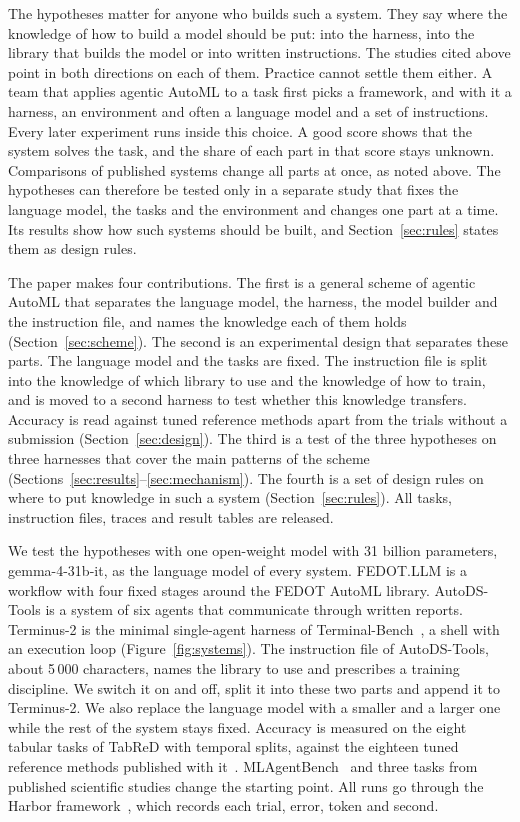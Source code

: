 The hypotheses matter for anyone who builds such a system. They say where
the knowledge of how to build a model should be put: into the harness, into
the library that builds the model or into written instructions. The studies cited above point in both directions
on each of them. Practice cannot settle them either. A team that applies
agentic AutoML to a task first picks a framework, and with it a harness, an
environment and often a language model and a set of instructions. Every
later experiment runs inside this choice. A good score shows that the system
solves the task, and the share of each part in that score stays unknown.
Comparisons of published systems change all parts at once, as noted above.
The hypotheses can therefore be tested only in a separate study that fixes
the language model, the tasks and the environment and changes one part at a
time. Its results show how such systems should be built, and
Section~\ref{sec:rules} states them as design rules.

The paper makes four contributions. The first is a general scheme of
agentic AutoML that separates the language model, the harness, the model
builder and the instruction file, and names the knowledge each of them holds
(Section~\ref{sec:scheme}). The second is an experimental design that
separates these parts. The language model and the tasks are fixed. The
instruction file is split into the knowledge of which library to use and
the knowledge of how to train, and is moved to a second harness to test
whether this knowledge transfers. Accuracy is read against tuned reference
methods apart from the trials without a submission
(Section~\ref{sec:design}). The third is a test of the three hypotheses on
three harnesses that cover the main patterns of the scheme
(Sections~\ref{sec:results}--\ref{sec:mechanism}). The fourth is a set of
design rules on where to put knowledge in such a system
(Section~\ref{sec:rules}). All tasks, instruction files, traces and
result tables are released.

We test the hypotheses with one open-weight model with 31 billion
parameters, gemma-4-31b-it, as the language model of every system.
FEDOT.LLM is a workflow with four fixed stages around the FEDOT AutoML
library. AutoDS-Tools is a system of six agents that communicate through
written reports. Terminus-2 is the minimal single-agent harness of
Terminal-Bench~\citep{merrill2026terminalbench}, a shell with an execution
loop (Figure~\ref{fig:systems}). The instruction file of AutoDS-Tools, about
5\,000 characters, names the library to use and prescribes a training
discipline. We switch it on and off, split it into these two parts and
append it to Terminus-2. We also replace the language model with a smaller
and a larger one while the rest of the system stays fixed. Accuracy is measured on the eight tabular tasks of TabReD
with temporal splits, against the eighteen tuned reference methods published
with it~\citep{rubachev2024tabred}. MLAgentBench~\citep{huang2024mlagentbench}
and three tasks from published scientific studies change the starting point.
All runs go through the Harbor framework~\citep{harbor2026}, which records
each trial, error, token and second.

